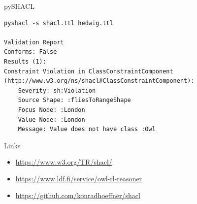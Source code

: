 \documentclass[14pt,aspectratio=1610]{beamer}
\begin{document}
\begin{frame}[fragile]{pySHACL}
\small
\begin{lstlisting}
pyshacl -s shacl.ttl hedwig.ttl

Validation Report
Conforms: False
Results (1):
Constraint Violation in ClassConstraintComponent (http://www.w3.org/ns/shacl#ClassConstraintComponent):
	Severity: sh:Violation
	Source Shape: :fliesToRangeShape
	Focus Node: :London
	Value Node: :London
	Message: Value does not have class :Owl
\end{lstlisting}
\end{frame}

\begin{frame}{Links}
\begin{itemize}
\item \url{https://www.w3.org/TR/shacl/}
\item \url{https://www.ldf.fi/service/owl-rl-reasoner}
\item \url{https://github.com/konradhoeffner/shacl}
\end{itemize}
\end{frame}
\end{document}
